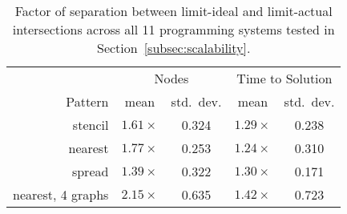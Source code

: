 \begin{table}[t]
\centering
\small
\begin{tabular}{r | c | c | c | c}
        & \multicolumn{2}{|c|}{Nodes} & \multicolumn{2}{|c}{Time to Solution} \\
Pattern & mean & std.~dev. & mean & std.~dev. \\
\hline
stencil & $1.61\times$ & 0.324 & $1.29\times$ & 0.238 \\
nearest & $1.77\times$ & 0.253 & $1.24\times$ & 0.310 \\
spread  & $1.39\times$ & 0.322 & $1.30\times$ & 0.171 \\
nearest, 4 graphs & $2.15\times$ & 0.635 & $1.42\times$ & 0.723
\end{tabular}

\vspace{-0.20cm}
\caption{Factor of separation between limit-ideal and limit-actual intersections across all 11 programming systems tested in Section~\ref{subsec:scalability}.\label{tab:metg-predict-strong}}
\vspace{-0.5cm}
\end{table}
